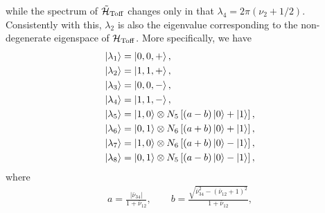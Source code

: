 while the spectrum of $\tilde{{\mathcal{H}}}_{\operatorname{Toff}}$ changes only in that
$\lambda_4 = 2\pi(\nu_2 + 1/2)$.
Consistently with this, $\lambda_2$ is also the eigenvalue corresponding to the non-degenerate eigenspace of ${\mathcal{H}}_{\operatorname{Toff}}$.
More specifically, we have
\begin{equation}
\begin{aligned}
	\ket{\lambda_1} &= \ket{0, 0, +}, \\
	\ket{\lambda_2} &= \ket{1, 1, +}, \\
	\ket{\lambda_3} &= \ket{0, 0, -}, \\
	\ket{\lambda_4} &= \ket{1, 1, -}, \\
	\ket{\lambda_5} &= \ket{1, 0} \otimes N_5\left[(a - b) \ket0 + \ket1 \right], \\
	\ket{\lambda_6} &= \ket{0, 1} \otimes N_6\left[(a + b) \ket0 + \ket1 \right], \\
	\ket{\lambda_7} &= \ket{1, 0} \otimes N_6\left[(a + b) \ket0 - \ket1 \right], \\
	\ket{\lambda_8} &= \ket{0, 1} \otimes N_5\left[(a - b) \ket0 - \ket1 \right],
\end{aligned}
\label{eq:toffoli_eigenvectors_solution}
\end{equation}
where
\begin{equation}
\newcommand{\denom}{1 + \bar\nu_{12}}
\begin{gathered}
	a = \frac{\lvert\bar\nu_{34}\rvert}{\denom{}},
	\qquad
	b = \frac{\sqrt{\bar\nu_{34}^2 - (\bar\nu_{12} + 1)^2}}{\denom{}},
\end{gathered}
\end{equation}
